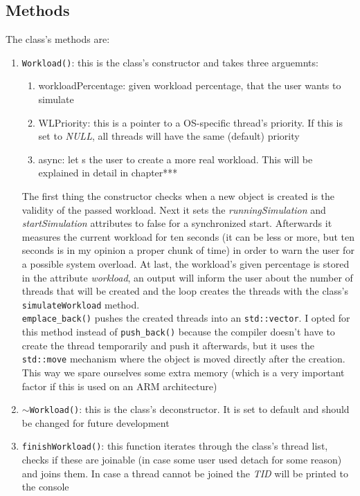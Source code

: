 \subsection{Methods}
The class's methods are:
\begin{enumerate}
	\item \texttt{Workload()}: this is the class's constructor and takes three arguemnts:
	\begin{enumerate}
		\item workloadPercentage: given workload percentage, that the user wants to simulate
		\item WLPriority: this is a pointer to a OS-specific thread's priority. If this is set to \textit{NULL}, all threads will have the same (default) priority
		\item async: let	s the user to create a more \dq real\dq{} workload. This will be explained in detail in chapter***  
	\end{enumerate}
	The first thing the constructor checks when a new object is created is the validity of the passed workload. Next it sets the \textit{runningSimulation} and \textit{startSimulation} attributes to false for a synchronized start. Afterwards it measures the current workload for ten seconds (it can be less or more, but ten seconds is in my opinion a proper chunk of time) in order to warn the user for a possible system overload.
	At last, the workload's given percentage is stored in the attribute \textit{workload}, an output will inform the user about the number of threads that will be created and the loop creates the threads with the class's \texttt{simulateWorkload} method.\\
	\texttt{emplace\_back()} pushes the created threads into an \texttt{std::vector}. I opted for this method instead of \texttt{push\_back()} because the compiler doesn't have to create the thread temporarily and push it afterwards, but it uses the \texttt{std::move} mechanism where the object is moved directly after the creation. This way we spare ourselves some extra memory (which is a very important factor if this is used on an ARM architecture)
	\item \texttt{$\sim$Workload()}: this is the class's deconstructor. It is set to default and should be changed for future development
	\item \texttt{finishWorkload()}: this function iterates through the class's thread list, checks if these are joinable (in case some user used detach for some reason) and joins them. In case a thread cannot be joined the \textit{TID} will be printed to the console\newpage

\end{enumerate}
